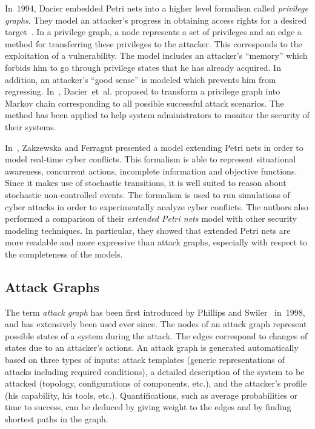 \documentclass[a4paper]{article}
\begin{document}
In~$1994$, Dacier embedded Petri nets into a higher level formalism called
\emph{privilege graphs}. They model an attacker's progress in obtaining access
rights for a desired target~\cite{Dacier1994,DaDe}.  In a privilege graph, a
node represents a set of privileges and an edge a method for transferring these
privileges to the attacker. This corresponds to the exploitation of a
vulnerability. The model includes an attacker's ``memory''  which forbids him to
go through privilege states that he has already acquired.  In addition, an
attacker's ``good sense'' is modeled which prevents him from  regressing.
In~\cite{DaDeKa}, Dacier~et~al. proposed to transform a privilege  graph into
Markov chain corresponding to all possible successful  attack scenarios. The
method has been applied to help  system administrators to monitor the security
of their systems.

In~\cite{ZaFe}, Zakzewska and Ferragut presented a model extending Petri nets 
in order to model real-time cyber conflicts. This formalism is able to 
represent situational awareness, concurrent actions, incomplete information and 
objective functions. Since it makes use of stochastic transitions, it is well 
suited to reason about stochastic non-controlled events. The formalism is used 
to run simulations of cyber attacks in order to experimentally analyze 
cyber conflicts. The authors also performed a 
comparison of their \emph{extended Petri nets} model with other security 
modeling techniques. In particular, they showed that extended Petri 
nets are more readable and more expressive than attack graphs, especially with 
respect to the completeness of the models. 

\subsection{Attack Graphs}
\label{sec:attack_graphs}

The term \emph{attack graph} has been first introduced by Phillips and 
Swiler~\cite{PhSw,SwPhElCh} in~$1998$, and has extensively been used ever 
since. The nodes of an attack graph represent possible states of a system during
the attack. The edges correspond to changes of states due to an attacker's 
actions. An attack graph is generated automatically based on three types of
inputs: attack templates (generic representations of attacks including required
conditions), a detailed description of the system to be attacked  (topology,
configurations of components, etc.), and the attacker's profile (his 
capability, his tools, etc.). Quantifications, such as average probabilities or 
time to success, can be deduced by giving  weight to the edges and by finding
shortest paths in the graph.
\end{document}
